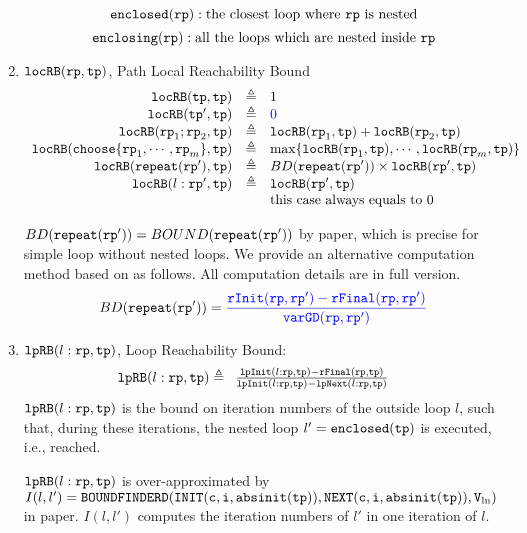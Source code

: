 \begin{enumerate}
      \[\mathtt{enclosed}(\mathtt{rp}): \text{the closest loop where } \mathtt{rp} \text{ is nested}\]
      \[\mathtt{enclosing}(\mathtt{rp}): \text{all the loops which are nested inside } \mathtt{rp}\]

      \item $\mathtt{locRB}(\mathtt{rp}, \mathtt{tp})$, Path Local Reachability Bound 
\[
  \begin{array}{rcl}
    \outinB(\tpath, \tpath) & \triangleq & 1 \\
    \outinB(\tpath', \tpath) & \triangleq & \highlight{0} \\
    \outinB(\rprog_1;\rprog_2, \tpath) & \triangleq & \outinB(\rprog_1, \tpath) + \outinB(\rprog_2, \tpath) \\
    \outinB(\rpchoose{\rprog_1, \cdots, \rprog_m }, \tpath) & \triangleq 
    & \max\left\{ \outinB(\rprog_1, \tpath), \cdots, \outinB(\rprog_m, \tpath) \right\} \\
    \outinB(\rprepeat(\rprog'), \tpath) & \triangleq 
    & BD(\rprepeat(\rprog'))
     \times \outinB(\rprog', \tpath)
     \\
    \outinB(l: \rprog', \tpath) & \triangleq & \outinB(\rprog', \tpath) \\
    &  & \text{this case always equals to } 0 \\
  \end{array}
  \]

  $BD(\mathtt{repeat}(\mathtt{rp}')) = BOUND(\mathtt{repeat}(\mathtt{rp}'))$ by paper\cite{GulwaniJK09}, which is precise for simple loop without nested loops. 
  We provide an alternative computation method based on \cite{sinn2017complexity} as follows. All computation details are in full version.
  \[
    BD(\rprepeat(\rprog')) = \highlight{\frac{\rfinit(\rprog, \rprog') - \rffinal(\rprog, \rprog')}{\varGD(\rprog, \rprog')}}
\]
      \item $\mathtt{lpRB}(l: \mathtt{rp}, \mathtt{tp})$,
      {Loop Reachability Bound}:
      \[
        \mathtt{lpRB}(l: \mathtt{rp}, \mathtt{tp}) \triangleq
        \begin{array}{ll}
          \frac{\mathtt{lpInit}(l: \mathtt{rp}, \mathtt{tp}) - \mathtt{rFinal}(\mathtt{rp}, \mathtt{tp})}{\mathtt{lpInit}(l: \mathtt{rp}, \mathtt{tp}) - \mathtt{lpNext}(l: \mathtt{rp}, \mathtt{tp})}
          & 
        \end{array}
        \]
        $\mathtt{lpRB}(l: \mathtt{rp}, \mathtt{tp})$
        is the bound on iteration numbers of the outside loop $l$,
        such that,
        during these iterations, the nested loop $l' = \mathtt{enclosed(\mathtt{tp})}$ is executed, i.e., reached.
        
        $\mathtt{lpRB}(l:\mathtt{rp}, \mathtt{tp})$ is over-approximated by
        $I(l, l') = \mathtt{BOUNDFINDERD(INIT(c, i, \mathtt{abs}{\mathtt{init}}(\mathtt{tp})), NEXT(c, i, \mathtt{abs}{\mathtt{init}}(\mathtt{tp})), V_{\ln})}$ in paper\cite{GulwaniJK09}.
        $I(l, l')$ computes the iteration numbers of $l'$ in one iteration of $l$.
\end{enumerate}